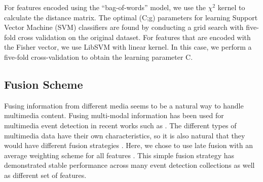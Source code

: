For features encoded using the ``bag-of-words'' model, we use the $\chi^2$ kernel to calculate the distance matrix. The optimal (C;g) parameters for learning Support Vector Machine (SVM) classifiers are found by conducting a grid search with five-fold cross validation on the original dataset. For features that are encoded with the Fisher vector, we use LibSVM with linear kernel. In this case, we perform a five-fold cross-validation to obtain the learning parameter C.

\subsection{Fusion Scheme}
Fusing information from different media seems to be a natural way to handle multimedia content. Fusing multi-modal information has been used for multimedia event detection in recent works such as \cite{natarajan2012multimodal,lan2012double,myers2014evaluating,oh2014multimedia}. The different types of multimedia data have their own characteristics, so it is also natural that they would have different fusion strategies \cite{xu2013feature}. Here, we chose to use late fusion with an average weighting scheme for all features \cite{snoek2005early}. This simple fusion strategy has demonstrated stable performance across many event detection collections as well as different set of features.

